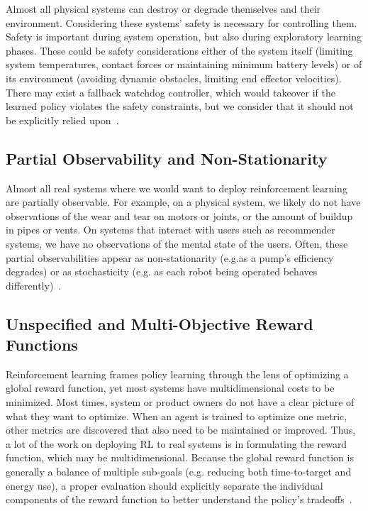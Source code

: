 \documentclass[letterpaper, 10 pt]{IEEEconf}
\begin{document}
Almost all physical systems can destroy or degrade themselves and
their environment. Considering these systems’ safety is necessary for
controlling them. Safety is important during system operation, but
also during exploratory learning phases. These could be safety
considerations either of the system itself (limiting system
temperatures, contact forces or maintaining minimum battery levels) or
of its environment (avoiding dynamic obstacles, limiting end effector
velocities). There may exist a fallback watchdog controller, which
would takeover if the learned policy violates the safety constraints,
but we consider that it should not be explicitly relied
upon~\cite{deepmind2019}.

\subsection{Partial Observability and Non-Stationarity}

Almost all real systems where we would want to deploy reinforcement
learning are partially observable. For example, on a physical system,
we likely do not have observations of the wear and tear on motors or
joints, or the amount of buildup in pipes or vents. On systems that
interact with users such as recommender systems, we have no
observations of the mental state of the users. Often, these partial
observabilities appear as non-stationarity (e.g.as a pump’s efficiency
degrades) or as stochasticity (e.g. as each robot being operated
behaves differently)~\cite{deepmind2019}.

\subsection{Unspecified and Multi-Objective Reward Functions}

Reinforcement learning frames policy learning through the lens of
optimizing a global reward function, yet most systems have
multidimensional costs to be minimized. Most times, system or product
owners do not have a clear picture of what they want to optimize. When
an agent is trained to optimize one metric, other metrics are
discovered that also need to be maintained or improved. Thus, a lot of
the work on deploying RL to real systems is in formulating the reward
function, which may be multidimensional. Because the global reward
function is generally a balance of multiple sub-goals (e.g. reducing
both time-to-target and energy use), a proper evaluation should
explicitly separate the individual components of the reward function
to better understand the policy’s tradeoffs~\cite{deepmind2019}.
\end{document}
